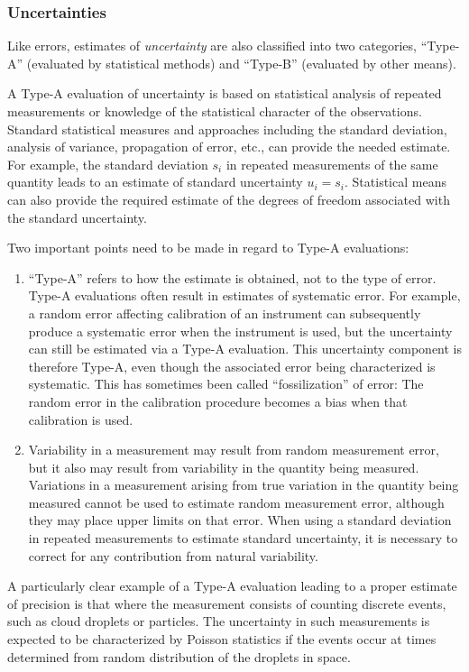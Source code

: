 \documentclass[12pt,twoside,english]{article}\usepackage[]{graphicx}\usepackage[]{color}
\let\OrgIndex\index
\renewcommand*{\index}[1]{\OrgIndex{#1}}
\begin{document}
\subsubsection{Uncertainties}

Like errors, estimates of \emph{uncertainty} are also classified into two categories, ``Type-A'' (evaluated by statistical methods) and ``Type-B'' (evaluated by other means). 


A Type-A evaluation of uncertainty is based on statistical analysis of repeated measurements or knowledge of the statistical character of the observations. Standard statistical measures and approaches including the standard deviation, analysis of variance, propagation of error, etc., can provide the needed estimate. For example, the standard deviation $s_{i}$ in repeated measurements of the same quantity leads to an estimate of standard uncertainty  $u_{i}=s_{i}$. Statistical means can also provide the required estimate of the degrees of freedom associated with the standard uncertainty. 

Two important points need to be made in regard to Type-A evaluations:  
\begin{enumerate}
\item ``Type-A'' refers to how the estimate is obtained, not to the type of error. Type-A evaluations often result in estimates of systematic error. For example, a random error affecting calibration of an instrument can subsequently produce a systematic error when the instrument is used, but the uncertainty can still be estimated via a Type-A evaluation. This uncertainty component is therefore Type-A, even though the associated error being characterized is systematic. This has sometimes been called ``fossilization'' of error: The random error in the calibration procedure becomes a bias when that calibration is used.  
\item Variability in a measurement may result from random measurement error, but it also may result from variability in the quantity being measured. Variations in a measurement arising from true variation in the quantity being measured cannot be used to estimate random measurement error, although they may place upper limits on that error. When using a standard deviation in repeated measurements to estimate standard uncertainty, it is necessary to correct for any contribution from natural variability.  
\end{enumerate}
A particularly clear example of a Type-A evaluation leading to a proper estimate of precision is that where the measurement consists of counting discrete events, such as cloud droplets or particles. The uncertainty in such measurements is expected to be characterized by Poisson statistics if the events occur at times determined from random distribution of the droplets in space. 
\end{document}
